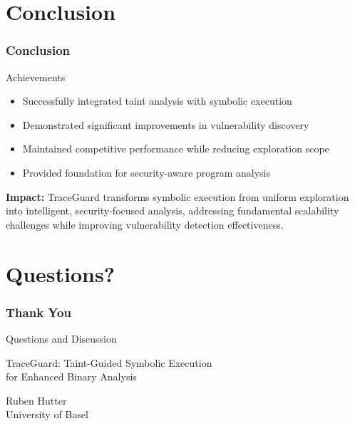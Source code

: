 \documentclass[aspectratio=169]{beamer}
\begin{document}
\section{Conclusion}

\begin{frame}
    \frametitle{Conclusion}
    \begin{evaluation}{Achievements}
        \begin{itemize}
            \item Successfully integrated taint analysis with symbolic execution
            \item Demonstrated significant improvements in vulnerability discovery
            \item Maintained competitive performance while reducing exploration scope
            \item Provided foundation for security-aware program analysis
        \end{itemize}
    \end{evaluation}
    
    \vspace{1em}
    \textbf{Impact:} TraceGuard transforms symbolic execution from uniform exploration into intelligent, security-focused analysis, addressing fundamental scalability challenges while improving vulnerability detection effectiveness.
\end{frame}

\section{Questions?}

\begin{frame}
    \frametitle{Thank You}
    \begin{center}
        \Large Questions and Discussion
        
        \vspace{2em}
        \normalsize
        TraceGuard: Taint-Guided Symbolic Execution \\
        for Enhanced Binary Analysis
        
        \vspace{1em}
        Ruben Hutter \\
        University of Basel
    \end{center}
\end{frame}
\end{document}
